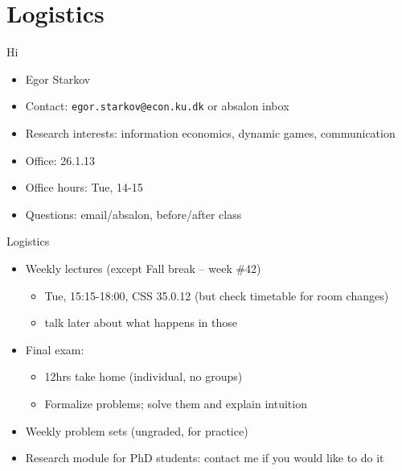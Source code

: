 \documentclass[english,10pt
,aspectratio=169
]{beamer}
\begin{document}
\section{Logistics}

\begin{frame}{Hi}
	\begin{itemize}
		\item Egor Starkov
		\item Contact: \texttt{egor.starkov@econ.ku.dk} or absalon inbox
		\item Research interests: information economics, dynamic games, communication
		\item Office: 26.1.13
		\item Office hours: Tue, 14-15
		\item Questions: email/absalon, before/after class
	\end{itemize}
\end{frame}


\begin{frame}{Logistics}
	\begin{itemize}
		\item Weekly lectures (except Fall break -- week \#42)
		\begin{itemize}
			\item Tue, 15:15-18:00, CSS 35.0.12 (but check timetable for room changes)
			\item talk later about what happens in those
		\end{itemize}
		
		
		\pause
		\item Final exam:
		\begin{itemize}
			\item 12hrs take home (individual, no groups)
			\item Formalize problems; solve them and explain intuition
		\end{itemize}
		
		\pause
		\item Weekly problem sets (ungraded, for practice)
		
		\pause
		\item Research module for PhD students: contact me if you would like to do it
	\end{itemize}
\end{frame}
\end{document}
